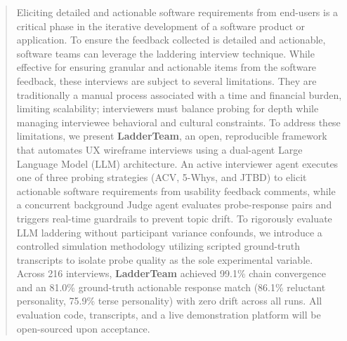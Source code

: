 \documentclass[sigconf,authordraft]{acmart}
\begin{document}
\begin{abstract}



Eliciting detailed and actionable software requirements from end-users is a critical phase in the iterative development of a software product or application. To ensure the feedback collected is detailed and actionable, software teams can leverage the laddering interview technique. While effective for ensuring granular and actionable items from the software feedback, these interviews are subject to several limitations. They are traditionally a manual process associated with a time and financial burden, limiting scalability; interviewers must balance probing for depth while managing interviewee behavioral and cultural constraints. To address these limitations, we present \textbf{LadderTeam}, an open, reproducible framework that automates UX wireframe interviews using a dual-agent Large Language Model (LLM) architecture. An active interviewer agent executes one of three probing strategies (ACV, 5-Whys, and JTBD) to elicit actionable software requirements from usability feedback comments, while a concurrent background Judge agent evaluates probe-response pairs and triggers real-time guardrails to prevent topic drift. To rigorously evaluate LLM laddering without participant variance confounds, we introduce a controlled simulation methodology utilizing scripted ground-truth transcripts to isolate probe quality as the sole experimental variable. Across 216 interviews, \textbf{LadderTeam} achieved 99.1\% chain convergence and an 81.0\% ground-truth actionable response match (86.1\% reluctant personality, 75.9\% terse personality) with zero drift across all runs. All evaluation code, transcripts, and a live demonstration platform will be open-sourced upon acceptance.
\end{abstract}
\end{document}
